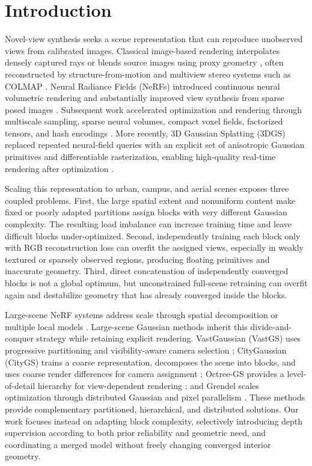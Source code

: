 \documentclass[conference]{IEEEtran}
\begin{document}
\section{Introduction}

Novel-view synthesis seeks a scene representation that can reproduce unobserved views from calibrated images. Classical image-based rendering interpolates densely captured rays or blends source images using proxy geometry \cite{levoy1996light,gortler1996lumigraph}, often reconstructed by structure-from-motion and multiview stereo systems such as COLMAP \cite{schonberger2016colmap}. Neural Radiance Fields (NeRFs) introduced continuous neural volumetric rendering and substantially improved view synthesis from sparse posed images \cite{mildenhall2020nerf}. Subsequent work accelerated optimization and rendering through multiscale sampling, sparse neural volumes, compact voxel fields, factorized tensors, and hash encodings \cite{barron2022mipnerf360,liu2020nsvf,reiser2021kilonerf,sun2022dvgo,chen2022tensorf,fridovichkeil2022plenoxels,muller2022instantngp}. More recently, 3D Gaussian Splatting (3DGS) replaced repeated neural-field queries with an explicit set of anisotropic Gaussian primitives and differentiable rasterization, enabling high-quality real-time rendering after optimization \cite{kerbl2023gaussiansplatting}.

Scaling this representation to urban, campus, and aerial scenes exposes three coupled problems. First, the large spatial extent and nonuniform content make fixed or poorly adapted partitions assign blocks with very different Gaussian complexity. The resulting load imbalance can increase training time and leave difficult blocks under-optimized. Second, independently training each block only with RGB reconstruction loss can overfit the assigned views, especially in weakly textured or sparsely observed regions, producing floating primitives and inaccurate geometry. Third, direct concatenation of independently converged blocks is not a global optimum, but unconstrained full-scene retraining can overfit again and destabilize geometry that has already converged inside the blocks.

Large-scene NeRF systems address scale through spatial decomposition or multiple local models \cite{turki2022meganerf,tancik2022blocknerf}. Large-scene Gaussian methods inherit this divide-and-conquer strategy while retaining explicit rendering. VastGaussian (VastGS) uses progressive partitioning and visibility-aware camera selection \cite{lin2024vastgaussian}; CityGaussian (CityGS) trains a coarse representation, decomposes the scene into blocks, and uses coarse render differences for camera assignment \cite{liu2024citygaussian}; Octree-GS provides a level-of-detail hierarchy for view-dependent rendering \cite{ren2024octreegs}; and Grendel scales optimization through distributed Gaussian and pixel parallelism \cite{zhao2025scaling3dgs}. These methods provide complementary partitioned, hierarchical, and distributed solutions. Our work focuses instead on adapting block complexity, selectively introducing depth supervision according to both prior reliability and geometric need, and coordinating a merged model without freely changing converged interior geometry.
\end{document}
